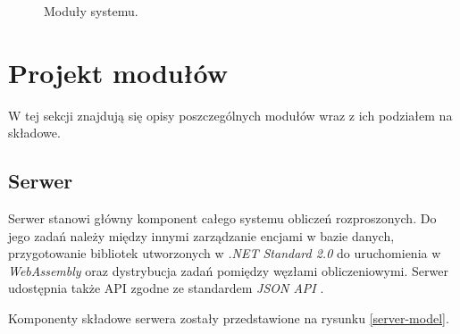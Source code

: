 \documentclass[a4paper,11pt,twoside]{report}
\theoremstyle{definition}
\begin{document}
\begin{figure}[H] 
	\caption{Moduły systemu.}
	\label{project-model}
\end{figure}

\section{Projekt modułów}

W tej sekcji znajdują się opisy poszczególnych modułów wraz z ich podziałem na składowe.

\subsection{Serwer}

Serwer stanowi główny komponent całego systemu obliczeń rozproszonych. Do jego zadań należy między innymi zarządzanie encjami w bazie danych, przygotowanie bibliotek utworzonych w \textit{.NET Standard 2.0} \cite{dotnet-standard} do uruchomienia w \textit{WebAssembly} \cite{webassembly} oraz dystrybucja zadań pomiędzy węzłami obliczeniowymi. Serwer udostępnia także API zgodne ze standardem \textit{JSON API} \cite{jsonapi}.

Komponenty składowe serwera zostały przedstawione na rysunku \ref{server-model}.
\end{document}
